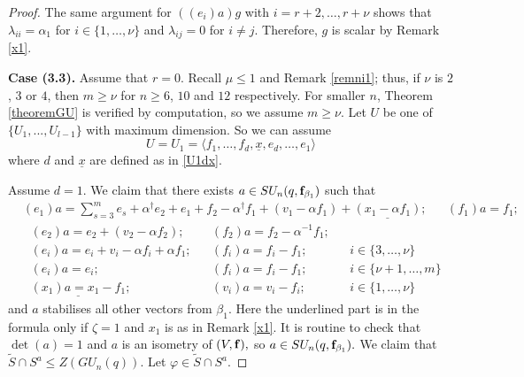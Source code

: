 \begin{proof}
The same argument for $((e_{i})a)g$ with $i=r+2, \ldots, r+ \nu$ shows that $\lambda_{ii}=\alpha_1$ for $i \in \{1, \ldots, \nu\}$ and $\lambda_{ij}=0$ for $i \ne j.$ Therefore, $g$  is scalar by Remark \ref{x1}. 

\medskip

{\bf Case (3.3).} Assume that $r=0$. Recall $\mu \le 1$ and Remark \ref{remni1}; thus, if $\nu$ is $2$, $3$ or $4$, then $m \ge \nu$ for $n \ge 6$, $10$ and $12$  respectively.     For smaller $n$, Theorem \ref{theoremGU} is verified by computation, so we assume $m \ge \nu$.    Let $U$ be one of  $\{U_1, ..., U_{l - 1}\}$ with maximum dimension.   So we can assume $$U=U_1 = \langle f_1, \ldots, f_d, \underline{x}, e_d, \ldots, e_1 \rangle$$
where $d$ and $\underline{x}$ are defined as in \eqref{U1dx}.


Assume $d=1.$
We claim that there exists  $a \in SU_n(q, {\bf f}_{\beta_1})$ such that 
\begin{align*}%
&(e_1)a =\sum_{s=3}^m e_s + \alpha^{\dagger}e_2 +e_1 +f_2 -\alpha^{\dagger}f_1 + (v_1 - \alpha f_{1}) + \underline{(x_1 -\alpha f_1)} ; & & (f_{1})a=f_{1}; & &  
\end{align*}
\begin{align*}
&(e_2)a = e_2 + (v_2 - \alpha f_2); & & (f_{2})a=f_{2}- \alpha^{-1}f_1; & &    \\
&(e_i)a =e_i+ v_i - \alpha f_i + \alpha f_1;   & & (f_{i})a=f_{i} - f_1 ; & &  i\in \{3, \ldots, \nu \}  \\
&(e_i)a =e_i;   & & (f_{i})a=f_{i} - f_1 ; & &  i\in \{\nu+1, \ldots, m \}  \\
&\underline{(x_1)a=x_1-f_{1}};&& (v_i)a= v_i-f_{i};&& i\in \{1, \ldots, \nu \}  
\end{align*}
and $a$ stabilises all other vectors from $\beta_1.$ Here the underlined part is  in the formula only if ${\zeta}=1$ and $x_1$ is as in Remark \ref{x1}.  It is routine to check that $\det(a)=1$ and $a$ is an isometry of $(V, {\bf f}),$ so $a \in SU_n(q,{\bf f}_{\beta_1}).$
We claim that $\tilde{S} \cap S^a \le Z(GU_n(q)).$ Let $\varphi \in \tilde{S} \cap S^a$.




\end{proof}
